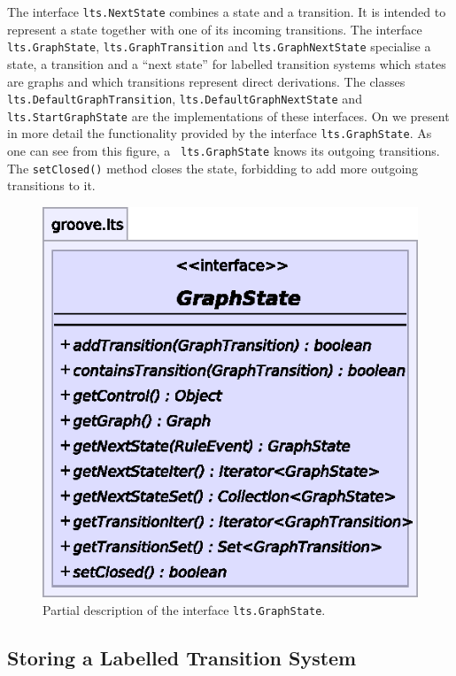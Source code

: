 The interface {\tt lts.NextState} combines a state and a transition. It is
intended to represent a state together with one of its incoming
transitions. The interface {\tt lts.GraphState}, {\tt lts.GraphTransition}
and {\tt lts.GraphNextState} specialise a state, a transition and a ``next
state'' for labelled transition systems which states are graphs and which
transitions represent direct derivations. The classes {\tt
  lts.DefaultGraphTransition}, {\tt lts.DefaultGraphNextState} and {\tt
  lts.StartGraphState} are the implementations of these interfaces. On
 we present in more detail the functionality provided by
the interface {\tt lts.GraphState}. As one can see from this figure, a {\tt
  lts.GraphState} knows its outgoing transitions. The {\tt setClosed()}
method closes the state, forbidding to add more outgoing transitions to it.

\begin{figure}[ht]
  \centering
  \includegraphics{fig/GraphState}
  \caption{Partial description of the interface {\tt lts.GraphState}.}
\end{figure}

\subsection{Storing a Labelled Transition System}

